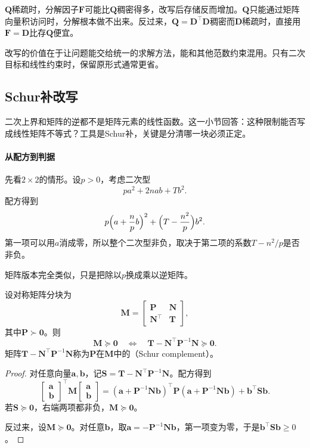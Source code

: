 $\bm{Q}$稀疏时，分解因子$\bm{F}$可能比$\bm{Q}$稠密得多，改写后存储反而增加。$\bm{Q}$只能通过矩阵向量积访问时，分解根本做不出来。反过来，$\bm{Q}=\bm{D}^\top\bm{D}$稠密而$\bm{D}$稀疏时，直接用$\bm{F}=\bm{D}$比存$\bm{Q}$便宜。

改写的价值在于让问题能交给统一的求解方法，能和其他范数约束混用。只有二次目标和线性约束时，保留原形式通常更省。

\subsection{Schur补改写}
\label{sec:cone-schur}

二次上界和矩阵的逆都不是矩阵元素的线性函数。这一小节回答：这种限制能否写成线性矩阵不等式？工具是Schur补，关键是分清哪一块必须正定。

\paragraph{从配方到判据}
先看$2\times2$的情形。设$p>0$，考虑二次型
\[
 pa^2+2nab+Tb^2.
\]
配方得到
\[
 p\Bigl(a+\frac{n}{p}b\Bigr)^2+\Bigl(T-\frac{n^2}{p}\Bigr)b^2.
\]
第一项可以用$a$消成零，所以整个二次型非负，取决于第二项的系数$T-n^2/p$是否非负。

矩阵版本完全类似，只是把除以$p$换成乘以逆矩阵。

\begin{lemma}[Schur补判据]
\label{lem:cone-schur}
设对称矩阵分块为
\begin{equation}
 \bm{M}=\begin{bmatrix}\bm{P}&\bm{N}\\\bm{N}^\top&\bm{T}\end{bmatrix},
 \label{eq:cone-block-matrix}
\end{equation}
其中$\bm{P}\succ\bm{0}$。则
\begin{equation}
 \bm{M}\succeq\bm{0}\quad\Longleftrightarrow\quad\bm{T}-\bm{N}^\top\bm{P}^{-1}\bm{N}\succeq\bm{0}.
 \label{eq:cone-schur}
\end{equation}
矩阵$\bm{T}-\bm{N}^\top\bm{P}^{-1}\bm{N}$称为$\bm{P}$在$\bm{M}$中的（Schur complement）。
\end{lemma}

\begin{proof}
对任意向量$\bm{a},\bm{b}$，记$\bm{S}=\bm{T}-\bm{N}^\top\bm{P}^{-1}\bm{N}$。配方得到
\[
 \begin{bmatrix}\bm{a}\\\bm{b}\end{bmatrix}^\top\bm{M}\begin{bmatrix}\bm{a}\\\bm{b}\end{bmatrix}
 =(\bm{a}+\bm{P}^{-1}\bm{N}\bm{b})^\top\bm{P}(\bm{a}+\bm{P}^{-1}\bm{N}\bm{b})+\bm{b}^\top\bm{S}\bm{b}.
\]
若$\bm{S}\succeq\bm{0}$，右端两项都非负，$\bm{M}\succeq\bm{0}$。

反过来，设$\bm{M}\succeq\bm{0}$。对任意$\bm{b}$，取$\bm{a}=-\bm{P}^{-1}\bm{N}\bm{b}$，第一项变为零，于是$\bm{b}^\top\bm{S}\bm{b}\geq0$。
\end{proof}

